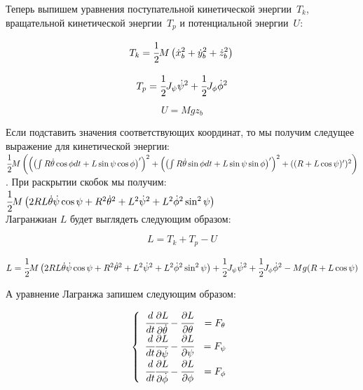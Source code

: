 \documentclass[12pt,a4paper,openany]{extarticle}
\begin{document}
Теперь выпишем уравнения поступательной кинетической энергии~$T_k$, вращательной кинетической энергии~$T_p$ и потенциальной энергии~$U$:

\begin{equation}
T_k=\cfrac12 M\left(\dot{x}_b^2+\dot{y}_b^2+\dot{z}_b^2\right)\\
\end{equation}

\begin{equation}
T_p=\cfrac12J_\psi\dot{\psi}^2+\cfrac12J_\phi\dot{\phi}^2
\end{equation}

\begin{equation}
U=Mgz_b
\end{equation}

Если подставить значения соответствующих координат, то мы получим следущее выражение для кинетической энергии: $\cfrac12 M\left(\left(\left(\int R\dot{\theta}\cos\phi dt+L\sin\psi\cos\phi\right)'\right)^2
+\left(\left(\int R\dot{\theta}\sin\phi dt+L\sin\psi\sin\phi\right)'\right)^2
+((R+L\cos\psi)')^2 \right)$. При раскрытии скобок мы получим: $\cfrac12 M\left(2RL\dot\theta \dot\psi\cos\psi+R^2 \dot{\theta}^2+L^2\dot\psi^2+L^2\dot{\phi}^2 \sin^2\psi\right)$\\
Лагранжиан $L$ будет выглядеть следующим образом:

\begin{equation}
L=T_k+T_p-U
\end{equation}

\begin{equation}
L=\cfrac12 M\left(2RL\dot\theta \dot\psi\cos\psi+R^2 \dot{\theta}^2+L^2\dot\psi^2+L^2\dot{\phi}^2 \sin^2\psi\right)+ \cfrac12J_\psi\dot{\psi}^2+\cfrac12J_\phi\dot{\phi}^2-Mg(R+L\cos\psi)
\end{equation}

А уравнение Лагранжа запишем следующим образом:

\begin{equation}
\left\{  
	\begin{array}{rcl} 
	\cfrac{d}{dt}\cfrac{\partial L}{\partial\dot{\theta}}-\cfrac{\partial L}{\partial 			\theta}&=F_\theta\\
	\cfrac{d}{dt}\cfrac{\partial L}{\partial\dot{\psi}}-\cfrac{\partial L}{\partial \psi}&=F_\psi\\
	\cfrac{d}{dt}\cfrac{\partial L}{\partial\dot{\phi}}-\cfrac{\partial L}{\partial \phi}&=F_\phi\\
	\end{array}   
	\right.
\end{equation}
\end{document}
